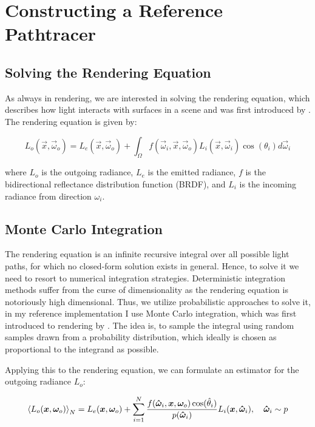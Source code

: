 
\chapter{Constructing a Reference Pathtracer}
\label{chap:pathtracing}

\section{Solving the Rendering Equation}

As always in rendering, we are interested in solving the rendering equation, which describes how light interacts with surfaces in a scene and was first introduced by \textcite{kajiya1986}.
The rendering equation is given by:

\begin{equation}
    L_o(\vec{x}, \vec{\omega}_o) = L_e(\vec{x}, \vec{\omega}_o) + \int_{\Omega} f(\vec{\omega}_i, \vec{x}, \vec{\omega}_o) L_i(\vec{x}, \vec{\omega}_i) \cos(\theta_i) d\vec{\omega}_i
\end{equation}

where $L_o$ is the outgoing radiance, $L_e$ is the emitted radiance, $f$ is the bidirectional reflectance distribution function (BRDF), and $L_i$ is the incoming radiance from direction $\omega_i$.

\section{Monte Carlo Integration}

The rendering equation is an infinite recursive integral over all possible light paths, for which no closed-form solution exists in general.
Hence, to solve it we need to resort to numerical integration strategies.
Deterministic integration methods suffer from the curse of dimensionality as the rendering equation is notoriously high dimensional.
Thus, we utilize probabilistic approaches to solve it, in my reference implementation I use Monte Carlo integration, which was first introduced to rendering by \textcite{kajiya1986}.
The idea is, to sample the integral using random samples drawn from a probability distribution, which ideally is chosen as proportional to the integrand as possible.

Applying this to the rendering equation, we can formulate an estimator for the outgoing radiance $L_o$:

\begin{equation}
    \estimator{L_o(\vec{x}, \vec{\omega}_o)} = L_e(\vec{x}, \vec{\omega}_o) + \sum_{i=1}^{N} \frac{f(\vec{\hat{\omega}}_i, \vec{x}, \vec{\omega}_o) \cos(\hat{\theta}_i)}{p(\vec{\hat{\omega}}_i)} L_i(\vec{x}, \vec{\hat{\omega}}_i), \quad \vec{\hat{\omega}}_i \sim p
\end{equation}

